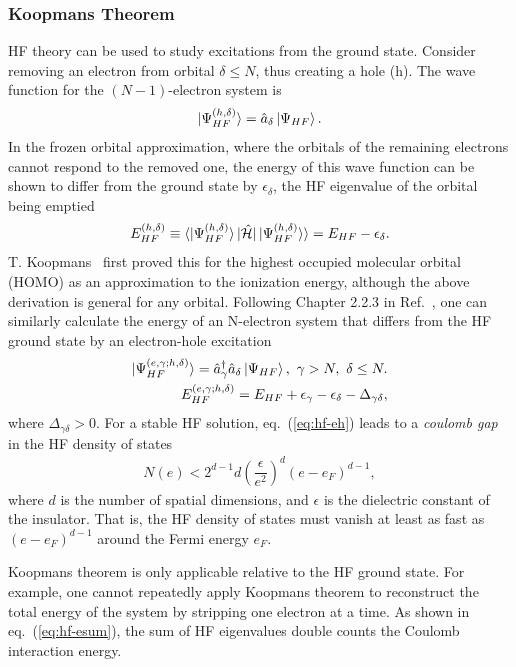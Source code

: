 \subsubsection{Koopmans Theorem}
HF theory can be used to study excitations from the ground state. Consider removing an electron from orbital $\delta\le N$, thus creating a hole (h). The wave function for the $(N-1)$-electron system is~\cite{Giuliani2005}
\begin{align}
\ket{\Psi_{HF}^{(h,\delta)}} = \hat{a}_\delta\ket{\Psi_{HF}}.
\end{align}
In the frozen orbital approximation, where the orbitals of the remaining electrons cannot respond to the removed one, the energy of this wave function can be shown to differ from the ground state by $\epsilon_\delta$, the HF eigenvalue of the orbital being emptied
\begin{align}
E_{HF}^{(h,\delta)} \equiv \braket{\ket{\Psi_{HF}^{(h,\delta)}}|\hat{\mathcal{H}}|\ket{\Psi_{HF}^{(h,\delta)}}} = E_{HF} - \epsilon_\delta.
\end{align}
T. Koopmans~\cite{Koopmans1934} first proved this for the highest occupied molecular orbital (HOMO) as an approximation to the ionization energy, although the above derivation is general for any orbital.
Following Chapter 2.2.3 in Ref.~\cite{Giuliani2005}, one can similarly calculate the energy of an N-electron system that differs from the HF ground state by an electron-hole excitation
\begin{align}
\ket{\Psi_{HF}^{(e,\gamma;h,\delta)}} = \hat{a}_\gamma^\dagger \hat{a}_\delta \ket{\Psi_{HF}}, ~\gamma>N,~\delta\le N. \\
E_{HF}^{(e,\gamma;h,\delta)} = E_{HF}+\epsilon_\gamma-\epsilon_\delta-\Delta_{\gamma\delta},
\label{eq:hf-eh}
\end{align}
where $\Delta_{\gamma\delta}>0$. For a stable HF solution, eq.~(\ref{eq:hf-eh}) leads to a \textit{coulomb gap} in the HF density of states
\begin{align}
N(e) < 2^{d-1}d\left(\dfrac{\epsilon}{e^2}\right)^d(e-e_F)^{d-1},
\end{align}
where $d$ is the number of spatial dimensions, and $\epsilon$ is the dielectric constant of the insulator. That is, the HF density of states must vanish at least as fast as $(e-e_F)^{d-1}$ around the Fermi energy $e_F$.

Koopmans theorem  is only applicable relative to the HF ground state. For example, one cannot repeatedly apply Koopmans theorem to reconstruct the total energy of the system by stripping one electron at a time. As shown in eq.~(\ref{eq:hf-esum}), the sum of HF eigenvalues double counts the Coulomb interaction energy.%

